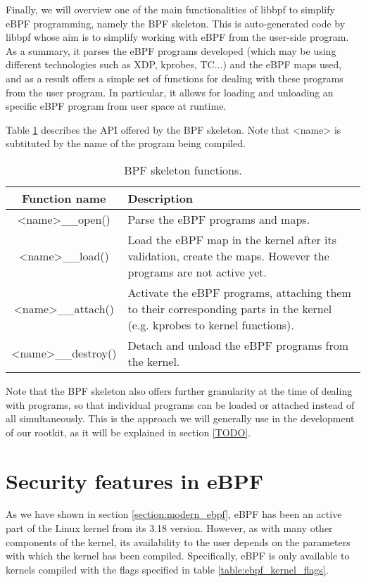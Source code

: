 Finally, we will overview one of the main functionalities of libbpf to simplify eBPF programming, namely the BPF skeleton. This is auto-generated code by libbpf whose aim is to simplify working with eBPF from the user-side program. As a summary, it parses the eBPF programs developed (which may be using different technologies such as XDP, kprobes, TC...) and the eBPF maps used, and as a result offers a simple set of functions for dealing with these programs from the user program. In particular, it allows for loading and unloading an specific eBPF program from user space at runtime.

Table \ref{table:libbpf_skel} describes the API offered by the BPF skeleton. Note that <name> is subtituted by the name of the program being compiled.

\begin{table}[htbp]
\begin{tabular}{|c|>{\centering\arraybackslash}p{10cm}|}
\hline
Function name & Description\\
\hline
\hline
<name>\_\_open() & Parse the eBPF programs and maps.\\
\hline
<name>\_\_load() & Load the eBPF map in the kernel after its validation, create the maps. However the programs are not active yet.\\
\hline
<name>\_\_attach() & Activate the eBPF programs, attaching them to their corresponding parts in the kernel (e.g. kprobes to kernel functions).\\
\hline
<name>\_\_destroy() & Detach and unload the eBPF programs from the kernel.\\
\hline
\end{tabular}
\caption{BPF skeleton functions.}
\label{table:libbpf_skel}
\end{table}

Note that the BPF skeleton also offers further granularity at the time of dealing with programs, so that individual programs can be loaded or attached instead of all simultaneously. This is the approach we will generally use in the development of our rootkit, as it will be explained in section \ref{TODO}.



\section{Security features in eBPF}
As we have shown in section \ref{section:modern_ebpf}, eBPF has been an active part of the Linux kernel from its 3.18 version. However, as with many other components of the kernel, its availability to the user depends on the parameters with which the kernel has been compiled. Specifically, eBPF is only available to kernels compiled with the flags specified in table \ref{table:ebpf_kernel_flags}.


